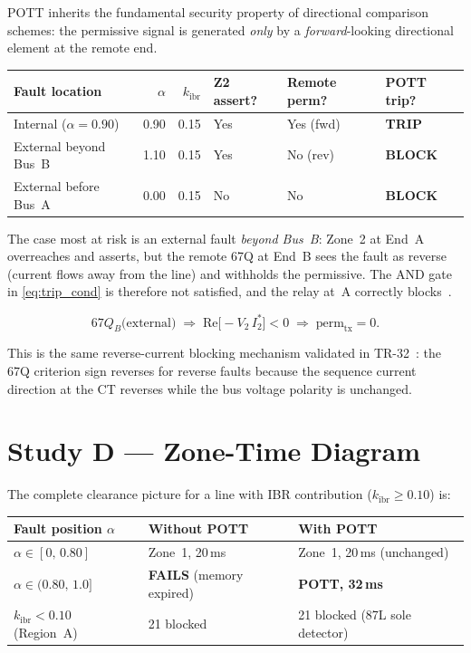 \documentclass[11pt,a4paper]{article}
\begin{document}
POTT inherits the fundamental security property of directional comparison schemes:
the permissive signal is generated \emph{only} by a \emph{forward}-looking
directional element at the remote end.

\begin{center}
\begin{tabular}{@{}lrrlll@{}}
\toprule
Fault location & $\alpha$ & $k_\mathrm{ibr}$ & Z2 assert? & Remote perm? & POTT trip?\\
\midrule
Internal ($\alpha=0.90$) & 0.90 & 0.15 & Yes & Yes (fwd) & \textbf{TRIP}\\
External beyond Bus~B    & 1.10 & 0.15 & Yes & No (rev)  & \textbf{BLOCK}\\
External before Bus~A    & 0.00 & 0.15 & No  & No        & \textbf{BLOCK}\\
\bottomrule
\end{tabular}
\end{center}

\medskip\noindent
The case most at risk is an external fault \emph{beyond Bus~B}: Zone~2 at End~A
overreaches and asserts, but the remote 67Q at End~B sees the fault as reverse
(current flows away from the line) and withholds the permissive.  The AND gate in
\eqref{eq:trip_cond} is therefore not satisfied, and the relay at~A correctly
blocks~\cite{Blackburn2006}.

\begin{equation}
  67Q_B\bigl(\text{external}\bigr)\;\Rightarrow\;
  \mathrm{Re}\bigl[-V_2\,I_2^*\bigr] < 0
  \;\Rightarrow\; \mathrm{perm}_\mathrm{tx}=0.
  \label{eq:security_67q}
\end{equation}

This is the same reverse-current blocking mechanism validated in
TR-32~\cite{SAMBP_TR32}: the 67Q criterion sign reverses for reverse faults because
the sequence current direction at the CT reverses while the bus voltage polarity is
unchanged.

\section{Study D --- Zone-Time Diagram}
\label{sec:zonetime}

The complete clearance picture for a line with IBR contribution
($k_\mathrm{ibr}\geq0.10$) is:

\begin{center}
\begin{tabular}{@{}lll@{}}
\toprule
Fault position $\alpha$ & Without POTT & With POTT\\
\midrule
$\alpha\in[0,\,0.80]$  & Zone~1, 20\,ms & Zone~1, 20\,ms (unchanged)\\
$\alpha\in(0.80,\,1.0]$ & \textbf{FAILS} (memory expired) & \textbf{POTT, 32\,ms}\\
$k_\mathrm{ibr}<0.10$ (Region~A) & 21 blocked & 21 blocked (87L sole detector)\\
\bottomrule
\end{tabular}
\end{center}
\end{document}
